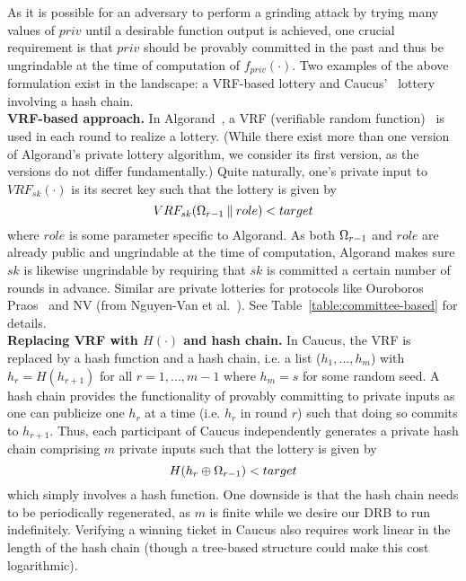 As it is possible for an adversary to perform a grinding attack by trying many values of $priv$ until a desirable function output is achieved, one crucial requirement is that $priv$ should be provably committed in the past and thus be ungrindable at the time of computation of $f_{priv}(\cdot)$. Two examples of the above formulation exist in the landscape: a VRF-based lottery and Caucus'~\cite{azouvi2018winning} lottery involving a hash chain.\\

\noindent\textbf{VRF-based approach.} In Algorand~\cite{gilad2017algorand}, a VRF (verifiable random function)~\cite{micali1999verifiable,dodis2005verifiable} is used in each round to realize a lottery. (While there exist more than one version of Algorand's private lottery algorithm, we consider its first version, as the versions do not differ fundamentally.) Quite naturally, one's private input to $VRF_{sk}(\cdot)$ is its secret key such that the lottery is given by
\[
VRF_{sk}(\Omega_{r - 1} \mathbin\Vert role) < target
\]
where $role$ is some parameter specific to Algorand. As both $\Omega_{r - 1}$ and $role$ are already public and ungrindable at the time of computation, Algorand makes sure $sk$ is likewise ungrindable by requiring that $sk$ is committed a certain number of rounds in advance. Similar are private lotteries for protocols like Ouroboros Praos~\cite{david2018ouroboros} and NV (from Nguyen-Van et al.~\cite{nguyen2019scalable}). See Table~\ref{table:committee-based} for details.\\

\noindent\textbf{Replacing VRF with $H(\cdot)$ and hash chain.} In Caucus, the VRF is replaced by a hash function and a hash chain, i.e. a list ($h_1, ..., h_m$) with $h_r = H(h_{r + 1})$ for all $r = 1, ..., m - 1$ where $h_m = s$ for some random seed. A hash chain provides the functionality of provably committing to private inputs as one can publicize one $h_r$ at a time (i.e. $h_r$ in round $r$) such that doing so commits to $h_{r + 1}$. Thus, each participant of Caucus independently generates a private hash chain comprising $m$ private inputs such that the lottery is given by
\[
H(h_r \oplus \Omega_{r - 1}) < target
\]
which simply involves a hash function. One downside is that the hash chain needs to be periodically regenerated, as $m$ is finite while we desire our DRB to run indefinitely. Verifying a winning ticket in Caucus also requires work linear in the length of the hash chain (though a tree-based structure could make this cost logarithmic).\\


